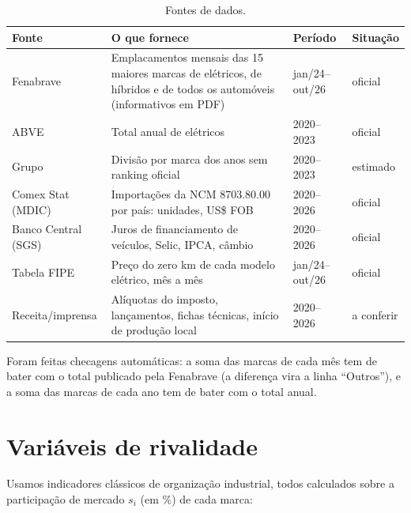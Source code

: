 \documentclass[11pt,a4paper]{article}
\begin{document}
\begin{table}[H]
\centering\small
\begin{tabularx}{\linewidth}{@{}l Y l l@{}}
\toprule
Fonte & O que fornece & Período & Situação \\
\midrule
Fenabrave & Emplacamentos mensais das 15 maiores marcas de elétricos, de híbridos e de todos os automóveis (informativos em PDF) & jan/24--out/26 & oficial \\
ABVE & Total anual de elétricos & 2020--2023 & oficial \\
Grupo & Divisão por marca dos anos sem ranking oficial & 2020--2023 & estimado \\
Comex Stat (MDIC) & Importações da NCM 8703.80.00 por país: unidades, US\$ FOB & 2020--2026 & oficial \\
Banco Central (SGS) & Juros de financiamento de veículos, Selic, IPCA, câmbio & 2020--2026 & oficial \\
Tabela FIPE & Preço do zero km de cada modelo elétrico, mês a mês & jan/24--out/26 & oficial \\
Receita/imprensa & Alíquotas do imposto, lançamentos, fichas técnicas, início de produção local & 2020--2026 & a conferir \\
\bottomrule
\end{tabularx}
\caption{Fontes de dados.}
\end{table}

Foram feitas checagens automáticas: a soma das marcas de cada mês tem de bater com o total publicado pela Fenabrave (a diferença vira a linha ``Outros''), e a soma das marcas de cada ano tem de bater com o total anual.

\section{Variáveis de rivalidade}
Usamos indicadores clássicos de organização industrial, todos calculados sobre a participação de mercado $s_i$ (em \%) de cada marca:
\end{document}
